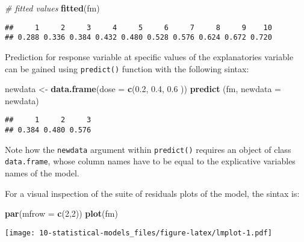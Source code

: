 \documentclass[]{book}
\newenvironment{Shaded}{\begin{snugshade}}{\end{snugshade}}
\newcommand{\KeywordTok}[1]{\textcolor[rgb]{0.13,0.29,0.53}{\textbf{{#1}}}}
\newcommand{\DataTypeTok}[1]{\textcolor[rgb]{0.13,0.29,0.53}{{#1}}}
\newcommand{\DecValTok}[1]{\textcolor[rgb]{0.00,0.00,0.81}{{#1}}}
\newcommand{\FloatTok}[1]{\textcolor[rgb]{0.00,0.00,0.81}{{#1}}}
\newcommand{\StringTok}[1]{\textcolor[rgb]{0.31,0.60,0.02}{{#1}}}
\newcommand{\CommentTok}[1]{\textcolor[rgb]{0.56,0.35,0.01}{\textit{{#1}}}}
\newcommand{\NormalTok}[1]{{#1}}
\begin{document}
\begin{Shaded}
\begin{Highlighting}[]
\CommentTok{# fitted values}
\KeywordTok{fitted}\NormalTok{(fm)}
\end{Highlighting}
\end{Shaded}

\begin{verbatim}
##     1     2     3     4     5     6     7     8     9    10 
## 0.288 0.336 0.384 0.432 0.480 0.528 0.576 0.624 0.672 0.720
\end{verbatim}

Prediction for response variable at specific values of the explanatories
variable can be gained using \texttt{predict()} function with the
following sintax:

\begin{Shaded}
\begin{Highlighting}[]
\NormalTok{newdata <-}\StringTok{ }\KeywordTok{data.frame}\NormalTok{(}\DataTypeTok{dose =} \KeywordTok{c}\NormalTok{(}\FloatTok{0.2}\NormalTok{, }\FloatTok{0.4}\NormalTok{, }\FloatTok{0.6} \NormalTok{))}
\KeywordTok{predict} \NormalTok{(fm, }\DataTypeTok{newdata =} \NormalTok{newdata)}
\end{Highlighting}
\end{Shaded}

\begin{verbatim}
##     1     2     3 
## 0.384 0.480 0.576
\end{verbatim}

Note how the \texttt{newdata} argument within \texttt{predict()}
requires an object of class \texttt{data.frame}, whose column names have
to be equal to the explicative variables names of the model.

\clearpage

For a visual inspection of the suite of residuals plots of the model,
the sintax is:

\begin{Shaded}
\begin{Highlighting}[]
\KeywordTok{par}\NormalTok{(}\DataTypeTok{mfrow =} \KeywordTok{c}\NormalTok{(}\DecValTok{2}\NormalTok{,}\DecValTok{2}\NormalTok{))}
\KeywordTok{plot}\NormalTok{(fm)}
\end{Highlighting}
\end{Shaded}

\texttt{[image: 10-statistical-models\_files/figure-latex/lmplot-1.pdf]}
\end{document}

